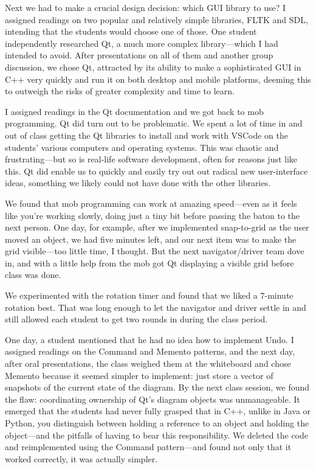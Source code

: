 \documentclass{article}
\begin{document}
Next we had to make a crucial design decision: which GUI library to use?
I assigned readings on two popular and relatively simple libraries, FLTK and
SDL, intending that the students would choose one of those. One student
independently researched Qt, a much more complex library---which I had
intended to avoid. After presentations on all of them and another group
discussion, we chose Qt, attracted by its ability to make a sophisticated
GUI in C++ very quickly and run it on both desktop and mobile platforms,
deeming this to outweigh the risks of greater complexity and time to learn.

I assigned readings in the Qt documentation and we got back to mob
programming.  Qt did turn out to be problematic. We spent a lot of time in and
out of class getting the Qt libraries to install and work with VSCode on the
students' various computers and operating systems.  This was chaotic and
frustrating---but so is real-life software development, often for reasons just
like this. Qt did enable us to quickly and easily try out out radical new
user-interface ideas, something we likely could not have done with the other
libraries.

We found that mob programming can work at amazing speed---even as it feels
like you're working slowly, doing just a tiny bit before passing the baton to
the next person.  One day, for example, after we implemented snap-to-grid as
the user moved an object, we had five minutes left, and our next item was to
make the grid visible---too little time, I thought. But the next
navigator/driver team dove in, and with a little help from the mob got Qt
displaying a visible grid before class was done.

We experimented with the rotation timer and found that we liked a 7-minute
rotation best. That was long enough to let the navigator and driver settle in
and still allowed each student to get two rounds in during the class period.

One day, a student mentioned that he had no idea how to implement Undo.
I assigned readings on the Command and Memento patterns, and the next day,
after oral presentations, the class weighed them at the whiteboard and chose
Memento because it seemed simpler to implement: just store a
vector of snapshots of the current state of the diagram. By the next class
session, we found the flaw: coordinating ownership of Qt's diagram objects was
unmanageable. It emerged that the students had never fully grasped that in
C++, unlike in Java or Python, you distinguish between holding a reference to
an object and holding the object---and the pitfalls of having to bear this
responsibility. We deleted the code and reimplemented using the Command
pattern---and found not only that it worked correctly, it was actually simpler.
\end{document}
